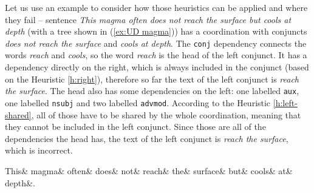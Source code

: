 Let us use an example to consider how those heuristics can be applied and where they fail -- sentence \textsl{This magma often does not reach the surface but cools at depth} (with a tree shown in (\ref{ex:UD magma})) has a coordination with conjuncts \textsl{does not reach the surface} and \textsl{cools at depth}. The \texttt{conj} dependency connects the words \textsl{reach} and \textsl{cools}, so the word \textsl{reach} is the head of the left conjunct. It has a dependency directly on the right, which is always included in the conjunct (based on the Heuristic \ref{h:right}), therefore so far the text of the left conjunct is \textsl{reach the surface}. The head also has some dependencies on the left: one labelled \texttt{aux}, one labelled \texttt{nsubj} and two labelled \texttt{advmod}. According to the Heuristic \ref{h:left-shared}, all of those have to be shared by the whole coordination, meaning that they cannot be included in the left conjunct. Since those are all of the dependencies the head has, the text of the left conjunct is \textsl{reach the surface}, which is incorrect. 

\begin{adjustwidth}{-20pt}{20pt}
\begin{exe}
    \ex\label{ex:UD magma}
    \begin{dependency}[hide label, baseline=-\the\dimexpr\fontdimen22\textfont2\relax]
        \begin{deptext}
            This\& magma\& often\& does\& not\& reach\& the\& surface\& but\& cools\& at\& depth\&.\footnotemark\\
        \end{deptext}
\end{dependency}
\end{exe}
\end{adjustwidth}

